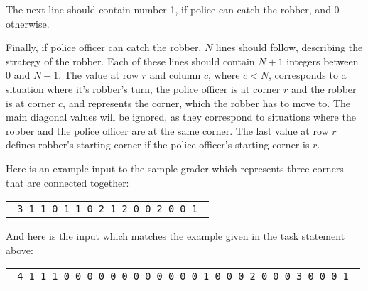 \documentclass{boi2014}
\begin{document}
    The next line should contain number 1, if police can catch the robber,
    and 0 otherwise.

    Finally, if police officer can catch the robber, $N$ lines should follow,
    describing the strategy of the robber.  Each of these lines should contain
    $N+1$ integers between 0 and $N-1$.  The value at row $r$ and column $c$,
    where $c < N$, corresponds to a situation where it's robber's turn, the
    police officer is at corner $r$ and the robber is at corner $c$, and
    represents the corner, which the robber has to move to.  The main diagonal
    values will be ignored, as they correspond to situations where the robber
    and the police officer are at the same corner.  The last value at row $r$
    defines robber's starting corner if the police officer's starting corner is $r$.
    
    Here is an example input to the sample grader which represents three corners
    that are connected together:

    \begin{center}
        \begin{tabular}{p{4cm}}
            {\tt
                3 \newline
                0 1 1 \newline
                1 0 1 \newline
                1 1 0 \newline
                1 \newline
                0 2 1 2 \newline
                2 0 0 2 \newline
                1 0 0 1 \newline
            }
        \end{tabular}
    \end{center}

    And here is the input which matches the example given in the task statement
    above:

    \begin{center}
        \begin{tabular}{p{4cm}}
            {\tt
                4 \newline
                0 1 1 1 \newline
                1 0 0 0 \newline
                1 0 0 0 \newline
                1 0 0 0 \newline
                1 \newline
                0 0 0 0 1 \newline
                2 0 0 0 2 \newline
                3 0 0 0 3 \newline
                1 0 0 0 1 \newline
            }
        \end{tabular}
    \end{center}
\end{document}
